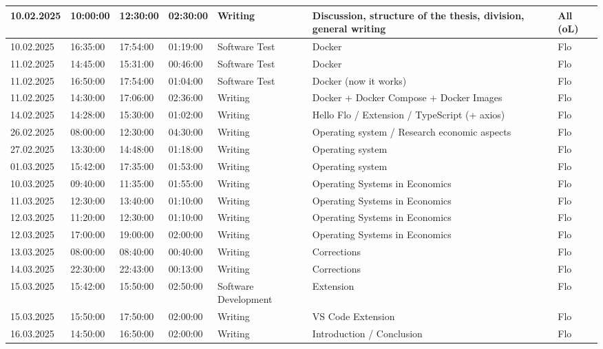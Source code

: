 \begin{longtable}{@{}p{1.8cm} p{1.2cm} p{1.2cm} p{1.2cm} p{2cm} p{4.5cm} p{2cm}@{}}
    \hline
    10.02.2025 & 10:00:00 & 12:30:00 & 02:30:00 & Writing & Discussion, structure of the thesis, division, general writing & All (oL) \\
    \hline
    10.02.2025 & 16:35:00 & 17:54:00 & 01:19:00 & Software Test & Docker & Flo \\
    \hline
    11.02.2025 & 14:45:00 & 15:31:00 & 00:46:00 & Software Test & Docker & Flo \\
    \hline
    11.02.2025 & 16:50:00 & 17:54:00 & 01:04:00 & Software Test & Docker (now it works) & Flo \\
    \hline
    11.02.2025 & 14:30:00 & 17:06:00 & 02:36:00 & Writing & Docker + Docker Compose + Docker Images & Flo \\
    \hline
    14.02.2025 & 14:28:00 & 15:30:00 & 01:02:00 & Writing & Hello Flo / Extension / TypeScript (+ axios) & Flo \\
    \hline
    26.02.2025 & 08:00:00 & 12:30:00 & 04:30:00 & Writing & Operating system / Research economic aspects & Flo \\
    \hline
    27.02.2025 & 13:30:00 & 14:48:00 & 01:18:00 & Writing & Operating system & Flo \\
    \hline
    01.03.2025   & 15:42:00 & 17:35:00 & 01:53:00 & Writing & Operating system & Flo \\
    \hline
    10.03.2025   & 09:40:00 & 11:35:00 & 01:55:00 & Writing & Operating Systems in Economics & Flo \\
    \hline
    11.03.2025   & 12:30:00 & 13:40:00 & 01:10:00 & Writing & Operating Systems in Economics & Flo \\
    \hline
    12.03.2025   & 11:20:00 & 12:30:00 & 01:10:00 & Writing & Operating Systems in Economics & Flo \\
    \hline
    12.03.2025   & 17:00:00 & 19:00:00 & 02:00:00 & Writing & Operating Systems in Economics & Flo \\
    \hline
    13.03.2025   & 08:00:00 & 08:40:00 & 00:40:00 & Writing & Corrections & Flo \\
    \hline
    14.03.2025   & 22:30:00 & 22:43:00 & 00:13:00 & Writing & Corrections & Flo \\
    \hline
    15.03.2025   & 15:42:00 & 15:50:00 & 02:50:00 & Software Development & Extension & Flo \\
    \hline
    15.03.2025   & 15:50:00 & 17:50:00 & 02:00:00 & Writing & VS Code Extension & Flo \\
    \hline
    16.03.2025   & 14:50:00 & 16:50:00 & 02:00:00 & Writing & Introduction / Conclusion& Flo \\

\end{longtable}
